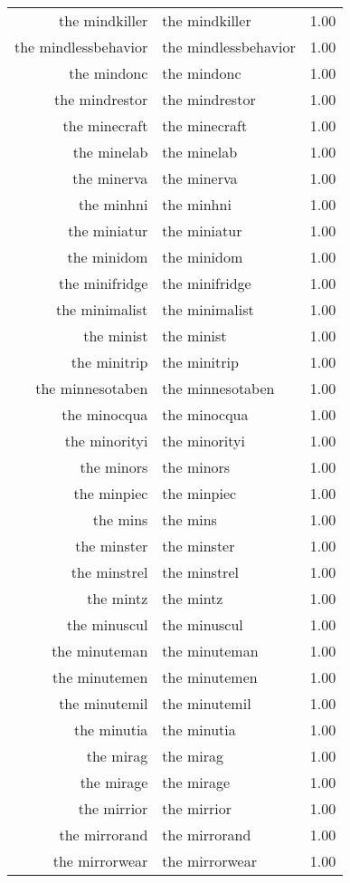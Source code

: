 \begin{table}[ht]
\begin{tabular}{rlr}
  the mindkiller & the mindkiller & 1.00 \\ 
  the mindlessbehavior & the mindlessbehavior & 1.00 \\ 
  the mindonc & the mindonc & 1.00 \\ 
  the mindrestor & the mindrestor & 1.00 \\ 
  the minecraft & the minecraft & 1.00 \\ 
  the minelab & the minelab & 1.00 \\ 
  the minerva & the minerva & 1.00 \\ 
  the minhni & the minhni & 1.00 \\ 
  the miniatur & the miniatur & 1.00 \\ 
  the minidom & the minidom & 1.00 \\ 
  the minifridge & the minifridge & 1.00 \\ 
  the minimalist & the minimalist & 1.00 \\ 
  the minist & the minist & 1.00 \\ 
  the minitrip & the minitrip & 1.00 \\ 
  the minnesotaben & the minnesotaben & 1.00 \\ 
  the minocqua & the minocqua & 1.00 \\ 
  the minorityi & the minorityi & 1.00 \\ 
  the minors & the minors & 1.00 \\ 
  the minpiec & the minpiec & 1.00 \\ 
  the mins & the mins & 1.00 \\ 
  the minster & the minster & 1.00 \\ 
  the minstrel & the minstrel & 1.00 \\ 
  the mintz & the mintz & 1.00 \\ 
  the minuscul & the minuscul & 1.00 \\ 
  the minuteman & the minuteman & 1.00 \\ 
  the minutemen & the minutemen & 1.00 \\ 
  the minutemil & the minutemil & 1.00 \\ 
  the minutia & the minutia & 1.00 \\ 
  the mirag & the mirag & 1.00 \\ 
  the mirage & the mirage & 1.00 \\ 
  the mirrior & the mirrior & 1.00 \\ 
  the mirrorand & the mirrorand & 1.00 \\ 
  the mirrorwear & the mirrorwear & 1.00 \\ 

\end{tabular}
\end{table}
